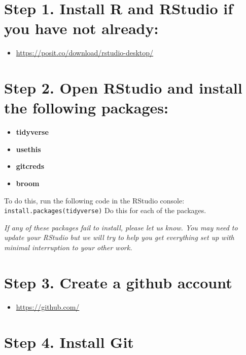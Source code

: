 \documentclass[
]{book}
\providecommand{\tightlist}{%
  \setlength{\itemsep}{0pt}\setlength{\parskip}{0pt}}
\begin{document}
\hypertarget{step-1.-install-r-and-rstudio-if-you-have-not-already}{%
\section{Step 1. Install R and RStudio if you have not already:}\label{step-1.-install-r-and-rstudio-if-you-have-not-already}}

\begin{itemize}
\tightlist
\item
  \url{https://posit.co/download/rstudio-desktop/}
\end{itemize}

\hypertarget{step-2.-open-rstudio-and-install-the-following-packages}{%
\section{Step 2. Open RStudio and install the following packages:}\label{step-2.-open-rstudio-and-install-the-following-packages}}

\begin{itemize}
\tightlist
\item
  \textbf{tidyverse}
\item
  \textbf{usethis}
\item
  \textbf{gitcreds}
\item
  \textbf{broom}
\end{itemize}

To do this, run the following code in the RStudio console:
\texttt{install.packages(\textquotesingle{}tidyverse\textquotesingle{})}
Do this for each of the packages.

\emph{If any of these packages fail to install, please let us know. You may need to update your RStudio but we will try to help you get everything set up with minimal interruption to your other work.}

\hypertarget{step-3.-create-a-github-account}{%
\section{Step 3. Create a github account}\label{step-3.-create-a-github-account}}

\begin{itemize}
\tightlist
\item
  \url{https://github.com/}
\end{itemize}

\hypertarget{step-4.-install-git}{%
\section{Step 4. Install Git}\label{step-4.-install-git}}
\end{document}
